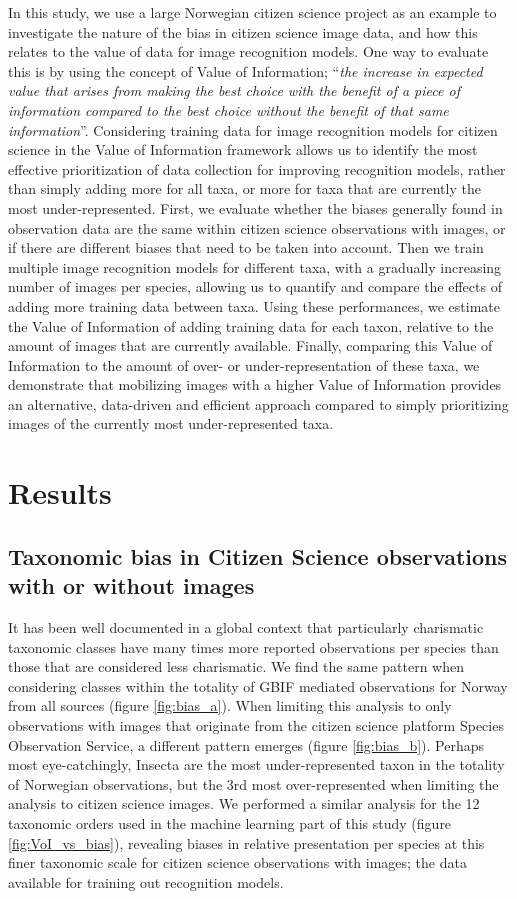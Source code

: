 \documentclass{article}
\begin{document}
In this study, we use a large Norwegian citizen science project as an example to investigate the nature of the bias in citizen science image data, and how this relates to the value of data for image recognition models. One way to evaluate this is by using the concept of Value of Information; ``\textit{the increase in expected value that arises from making the best choice with the benefit of a piece of information compared to the best choice without the benefit of that same information}''\autocite{Keisler2013}. Considering training data for image recognition models for citizen science in the Value of Information framework allows us to identify the most effective prioritization of data collection for improving recognition models, rather than simply adding more for all taxa, or more for taxa that are currently the most under-represented. First, we evaluate whether the biases generally found in observation data are the same within citizen science observations with images, or if there are different biases that need to be taken into account. Then we train multiple image recognition models for different taxa, with a gradually increasing number of images per species, allowing us to quantify and compare the effects of adding more training data between taxa. Using these performances, we estimate the Value of Information of adding training data for each taxon, relative to the amount of images that are currently available. Finally, comparing this Value of Information to the amount of over- or under-representation of these taxa, we demonstrate that mobilizing images with a higher Value of Information provides an alternative, data-driven and efficient approach compared to simply prioritizing images of the currently most under-represented taxa.


\section*{Results}
\subsection*{Taxonomic bias in Citizen Science observations with or without images}
It has been well documented in a global context that particularly charismatic taxonomic classes have many times more reported observations per species than those that are considered less charismatic\autocite{Troudet2017}. We find the same pattern when considering classes within the totality of GBIF mediated observations for Norway from all sources (figure \ref{fig:bias_a}). When limiting this analysis to only observations with images that originate from the citizen science platform Species Observation Service\autocite{GBIF_dataset}, a different pattern emerges (figure \ref{fig:bias_b}). Perhaps most eye-catchingly, Insecta are the most under-represented taxon in the totality of Norwegian observations, but the 3rd most over-represented when limiting the analysis to citizen science images. We performed a similar analysis for the 12 taxonomic orders used in the machine learning part of this study (figure \ref{fig:VoI_vs_bias}), revealing biases in relative presentation per species at this finer taxonomic scale for citizen science observations with images; the data available for training out recognition models.
\end{document}
